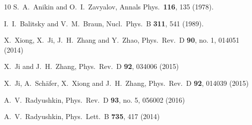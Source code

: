 \documentclass[final,5p,times,twocolumn]{elsarticle}
\begin{document}
\begin{thebibliography}{10}
  S.~A.~Anikin and O.~I.~Zavyalov,
  Annals Phys.\  {\bf 116}, 135 (1978).


  I.~I.~Balitsky and V.~M.~Braun,
  Nucl.\ Phys.\ B {\bf 311}, 541 (1989).


  X.~Xiong, X.~Ji, J.~H.~Zhang and Y.~Zhao,
  Phys.\ Rev.\ D {\bf 90}, no. 1, 014051 (2014)


  X.~Ji and J.~H.~Zhang,
  Phys.\ Rev.\ D {\bf 92}, 034006 (2015)


  X.~Ji, A.~Sch\"afer, X.~Xiong and J.~H.~Zhang,
  Phys.\ Rev.\ D {\bf 92}, 014039 (2015)


  A.~V.~Radyushkin,
  Phys.\ Rev.\ D {\bf 93}, no. 5, 056002 (2016)


  A.~V.~Radyushkin,
  Phys.\ Lett.\ B {\bf 735}, 417 (2014)



\end{thebibliography}
\end{document}
